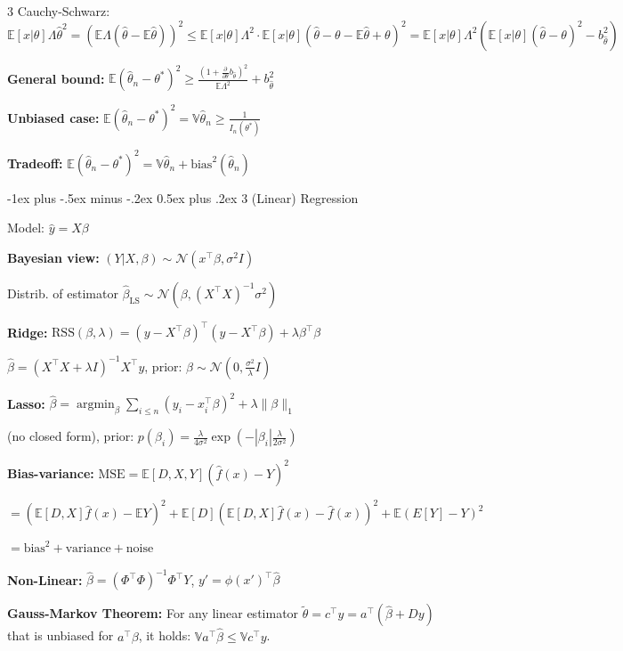 \documentclass[10pt,landscape,a4paper]{article}
\makeatletter
\renewcommand{\section}{\@startsection{section}{1}{0mm}%
                                {-1ex plus -.5ex minus -.2ex}%
                                {0.5ex plus .2ex}%
                                {\normalfont\large\bfseries}}
\newcommand{\E}{\mathbb{E}}
\newcommand{\V}{\mathbb{V}}
\DeclareMathOperator*{\argmin}{argmin}
\makeatother
\begin{document}
\begin{multicols}{3}
Cauchy-Schwarz: $\E[x|\theta]{\Lambda\hat{\theta}}^2 = (\E{\Lambda(\hat{\theta} - \E{\hat{\theta}})})^2 \leq \E[x|\theta]{\Lambda^2} \cdot \E[x|\theta]{(\hat{\theta} - \theta - \E{\hat{\theta}} + \theta)^2} = \E[x|\theta]{\Lambda^2}(\E[x|\theta]{(\hat{\theta} - \theta)^2} - b_{\hat{\theta}}^2)$

\textbf{General bound:} $\E{(\hat{\theta}_n - \theta^*)^2} \geq \frac{(1 + \frac{\partial}{\partial \theta}b_{\hat{\theta}})^2}{\E{\Lambda^2}} + b_{\hat{\theta}}^2$

\textbf{Unbiased case:} $\E{(\hat{\theta}_n - \theta^*)^2} = \V{\hat{\theta}_n} \geq \frac{1}{I_n(\theta^*)}$

\textbf{Tradeoff:} $\E{(\hat{\theta}_n - \theta^*)^2} = \V{\hat{\theta}_n} + \text{bias}^2(\hat{\theta}_n)$

\section{3 (Linear) Regression}

Model: $\hat{y} = X\beta$

\textbf{Bayesian view:} $(Y|X,\beta) \sim \mathcal{N}(x^\top\beta, \sigma^2 I)$

Distrib. of estimator $\hat{\beta}_{\text{LS}} \sim \mathcal{N}(\beta, (X^\top X)^{-1}\sigma^2)$

\textbf{Ridge:} $\text{RSS}(\beta,\lambda) = (y - X^\top\beta)^\top(y - X^\top\beta) + \lambda\beta^\top\beta$

$\hat{\beta} = (X^\top X + \lambda I)^{-1}X^\top y$, prior: $\beta \sim \mathcal{N}(0, \frac{\sigma^2}{\lambda}I)$

\textbf{Lasso:} $\hat{\beta} = \argmin_\beta \sum_{i \leq n}(y_i - x_i^\top\beta)^2 + \lambda\|\beta\|_1$

(no closed form), prior: $p(\beta_i) = \frac{\lambda}{4\sigma^2}\exp(-|\beta_i|\frac{\lambda}{2\sigma^2})$

\textbf{Bias-variance:} $\text{MSE} = \E[D,X,Y]{(\hat{f}(x) - Y)^2}$

$= (\E[D,X]{\hat{f}(x)} - \E{Y})^2 + \E[D]{(\E[D,X]{\hat{f}(x)} - \hat{f}(x))^2} + \E{(E[Y] - Y)^2}$

$= \text{bias}^2 + \text{variance} + \text{noise}$

\textbf{Non-Linear:} $\hat{\beta} = (\Phi^\top\Phi)^{-1}\Phi^\top Y$, $y' = \phi(x')^\top\hat{\beta}$

\textbf{Gauss-Markov Theorem:} For any linear estimator $\tilde{\theta} = c^\top y = a^\top(\hat{\beta} + Dy)$ that is unbiased for $a^\top\beta$, it holds: $\V{a^\top\hat{\beta}} \leq \V{c^\top y}$.


\end{multicols}
\end{document}
